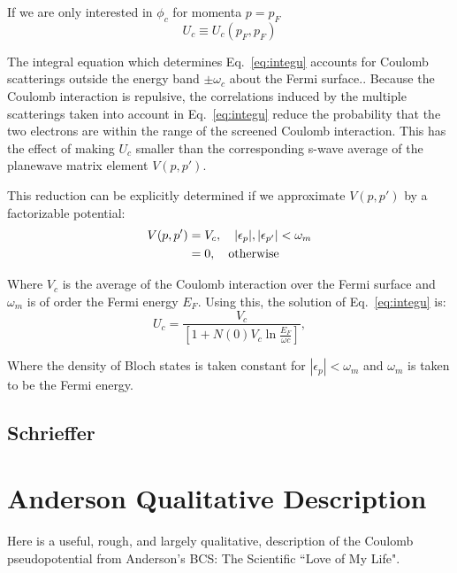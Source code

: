 \documentclass{article}
\def\p{{\bf p}}
\begin{document}
If we are only interested in $\phi_{c}$ for momenta $p = p_{F}$
\begin{equation}
U_{c} \equiv U_{c}(p_{F},p_{F})
\end{equation}

The integral equation which determines Eq.~\ref{eq:integu} accounts for Coulomb
scatterings outside the energy band $\pm \omega_{c}$ about the Fermi surface..
Because the Coulomb interaction is repulsive,
the correlations induced by the multiple scatterings taken
into account in Eq.~\ref{eq:integu} reduce the probability that the two
electrons are within the range of the screened Coulomb
interaction. This has the effect of making
$U_{c}$ smaller than the corresponding s-wave average 
of the planewave matrix element $V(p,p')$.

This reduction can be explicitly determined if we approximate $V(p,p')$
by a  factorizable potential:
%
\begin{align}
V(p,p') & =  V_{c}, \quad |\epsilon_{p}|, |\epsilon_{p'}| < \omega_{m} \nonumber \\
        & =  0, \quad {\rm otherwise}
\end{align}

Where $V_{c}$ is the average of the Coulomb interaction over
the Fermi surface and $\omega_{m}$ is of order the Fermi energy
$E_{F}$. Using this, the solution of Eq.~\ref{eq:integu} is:
%
\begin{equation}
U_{c} = \frac{V_{c}}{[1+N(0)V_{c} \ln{\frac{E_{F}}{\omega{c}}}]},
\end{equation}

Where the density of Bloch states is taken constant for $|\epsilon_{p}| < \omega_{m}$ 
and $\omega_{m}$ is taken to be the Fermi energy.

%
%
\subsection{Schrieffer}

\section{Anderson Qualitative Description}
%
Here is a useful, rough, and largely qualitative, description of the Coulomb 
pseudopotential from Anderson's BCS: The Scientific ``Love of My Life".
\end{document}
